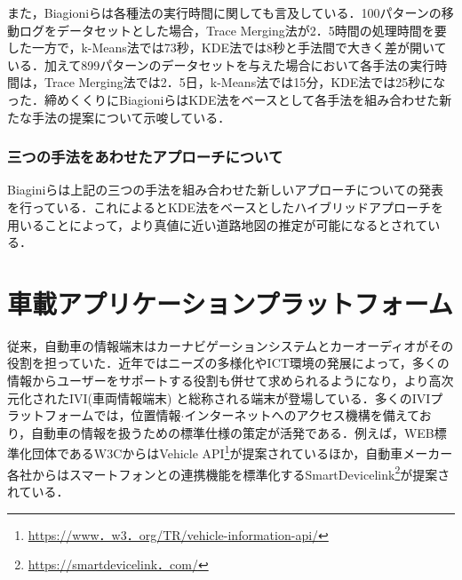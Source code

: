 また，Biagioniらは各種法の実行時間に関しても言及している．100パターンの移動ログをデータセットとした場合，Trace Merging法が2．5時間の処理時間を要した一方で，k-Means法では73秒，KDE法では8秒と手法間で大きく差が開いている．加えて899パターンのデータセットを与えた場合において各手法の実行時間は，Trace Merging法では2．5日，k-Means法では15分，KDE法では25秒になった．締めくくりにBiagioniらはKDE法をベースとして各手法を組み合わせた新たな手法の提案について示唆している．

\subsubsection{三つの手法をあわせたアプローチについて}
Biaginiらは上記の三つの手法を組み合わせた新しいアプローチについての発表を行っている\cite{google-mouyatteta}．これによるとKDE法をベースとしたハイブリッドアプローチを用いることによって，より真値に近い道路地図の推定が可能になるとされている．


\section{車載アプリケーションプラットフォーム}
\label{ivi}
従来，自動車の情報端末はカーナビゲーションシステムとカーオーディオがその役割を担っていた．近年ではニーズの多様化やICT環境の発展によって，多くの情報からユーザーをサポートする役割も併せて求められるようになり，より高次元化されたIVI(車両情報端末) と総称される端末が登場している\cite{DICOMO}．多くのIVIプラットフォームでは，位置情報$\cdot$インターネットへのアクセス機構を備えており，自動車の情報を扱うための標準仕様の策定が活発である\cite{Ashimura}．例えば，WEB標準化団体であるW3CからはVehicle API\footnote{\url{https://www．w3．org/TR/vehicle-information-api/}}が提案されているほか，自動車メーカー各社からはスマートフォンとの連携機能を標準化するSmartDevicelink\footnote{\url{https://smartdevicelink．com/}}が提案されている．

